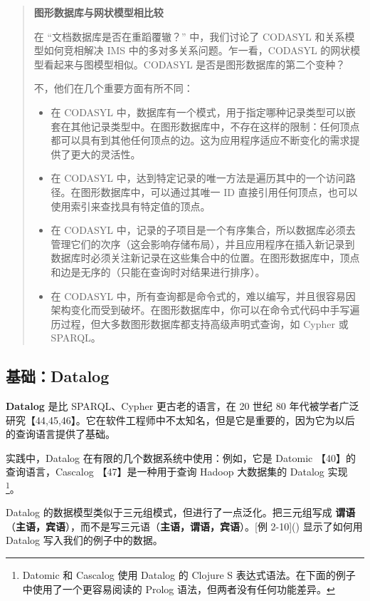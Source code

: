 \begin{quote}
    \textbf{图形数据库与网状模型相比较}
    
    在 “文档数据库是否在重蹈覆辙？” 中，我们讨论了 CODASYL 和关系模型如何竞相解决 IMS 中的多对多关系问题。乍一看，CODASYL 的网状模型看起来与图模型相似。CODASYL 是否是图形数据库的第二个变种？
    
    不，他们在几个重要方面有所不同：
    \begin{itemize}
        \item 在 CODASYL 中，数据库有一个模式，用于指定哪种记录类型可以嵌套在其他记录类型中。在图形数据库中，不存在这样的限制：任何顶点都可以具有到其他任何顶点的边。这为应用程序适应不断变化的需求提供了更大的灵活性。
        \item 在 CODASYL 中，达到特定记录的唯一方法是遍历其中的一个访问路径。在图形数据库中，可以通过其唯一 ID 直接引用任何顶点，也可以使用索引来查找具有特定值的顶点。
        \item 在 CODASYL 中，记录的子项目是一个有序集合，所以数据库必须去管理它们的次序（这会影响存储布局），并且应用程序在插入新记录到数据库时必须关注新记录在这些集合中的位置。在图形数据库中，顶点和边是无序的（只能在查询时对结果进行排序）。
        \item 在 CODASYL 中，所有查询都是命令式的，难以编写，并且很容易因架构变化而受到破坏。在图形数据库中，你可以在命令式代码中手写遍历过程，但大多数图形数据库都支持高级声明式查询，如 Cypher 或 SPARQL。
    \end{itemize}
\end{quote}

\subsection{基础：Datalog}

\textbf{Datalog} 是比 SPARQL、Cypher 更古老的语言，在 20 世纪 80 年代被学者广泛研究【44,45,46】。它在软件工程师中不太知名，但是它是重要的，因为它为以后的查询语言提供了基础。

实践中，Datalog 在有限的几个数据系统中使用：例如，它是 Datomic 【40】的查询语言，Cascalog 【47】是一种用于查询 Hadoop 大数据集的 Datalog 实现 \footnote{Datomic 和 Cascalog 使用 Datalog 的 Clojure S 表达式语法。在下面的例子中使用了一个更容易阅读的 Prolog 语法，但两者没有任何功能差异。}。

Datalog 的数据模型类似于三元组模式，但进行了一点泛化。把三元组写成 \textbf{谓语}（\textbf{主语，宾语}），而不是写三元语（\textbf{主语，谓语，宾语}）。[例 2-10]() 显示了如何用 Datalog 写入我们的例子中的数据。


